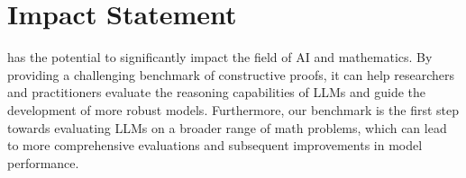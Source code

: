 \section*{Impact Statement} \label{sec:broader_impact}

\mc has the potential to significantly impact the field of AI and mathematics. By providing a challenging benchmark of constructive proofs, it can help researchers and practitioners evaluate the reasoning capabilities of LLMs and guide the development of more robust models. Furthermore, our benchmark is the first step towards evaluating LLMs on a broader range of math problems, which can lead to more comprehensive evaluations and subsequent improvements in model performance.
